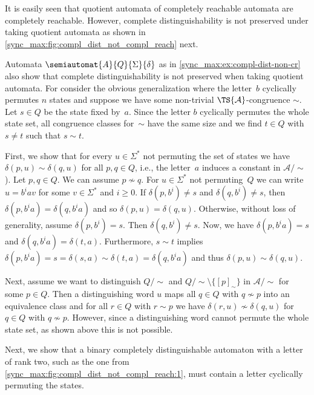 It is easily seen that quotient automata of completely reachable automata
are completely reachable. However, complete distinguishability is not preserved
under taking quotient automata as shown in \cref{sync_max:fig:compl_dist_not_compl_reach} next.

\begin{example} \label{sync_max:fig:compl_dist_not_compl_reach}
	Automata  $\semiautomat{A}{Q}{\Sigma}{\delta}$ as in \cref{sync_max:ex:compl-dist-non-cr}
	also show that complete distinguishability
	is not preserved when taking quotient automata.
	For consider the obvious generalization	where the letter~$b$ cyclically permutes $n$ states
	and suppose we have some non-trivial $\TS{\mathcal A}$-congruence $\sim$.
	Let $s \in Q$ be the state fixed by~$a$.
	Since the letter $b$ cyclically permutes the whole state set,
	all congruence classes for~$\sim$ have the same size
	and we find $t \in Q$ with $s \ne t$
	such that $s \sim t$.
		
	First, we show that for every $u \in \Sigma^*$ not permuting the set of states
	we have $\delta(p, u) \sim \delta(q, u)$
	for all $p,q \in Q$, i.e., the letter~$a$ induces a constant in $\mathcal A / {\sim}$).
	Let $p,q \in Q$. We can assume $p \not\sim q$.
	For $u \in \Sigma^*$ not permuting~$Q$
	we can write $u = b^iav$ for some $v \in \Sigma^*$ and $i \ge 0$.
	If $\delta(p, b^i) \ne s$ 
	and $\delta(q, b^i) \ne s$,
	then $\delta(p, b^ia) = \delta(q, b^ia)$
	and so $\delta(p, u) = \delta(q, u)$.
	Otherwise, without loss of generality, assume $\delta(p, b^i) = s$.
	Then $\delta(q, b^i) \ne s$.
	Now, we have $\delta(p, b^ia) = s$
	and $\delta(q, b^ia) = \delta(t, a)$.
	Furthermore, $s \sim t$
	implies $\delta(p, b^ia) = s = \delta(s, a) \sim \delta(t, a) = \delta(q, b^ia)$
	and thus $\delta(p, u) \sim \delta(q, u)$.
		
	Next, assume we want to distinguish $Q / {\sim}$
	and $Q / {\sim} \setminus \{ [p]_{\sim} \}$
	in $\mathcal A / {\sim}$ for some $p \in Q$.
	Then a distinguishing word $u$
	maps all $q \in Q$ with $q \not\sim p$
	into an equivalence class
	and for all $r \in Q$ with $r \sim p$
	we have $\delta(r, u) \not\sim \delta(q, u)$ for $q \in Q$ with $q \not\sim p$.
	However, since a distinguishing word cannot permute
	the whole state set, as shown above this is not possible.	
\end{example}

Next, we show that a binary completely distinguishable automaton with a letter of rank two, such as the one from \cref{sync_max:fig:compl_dist_not_compl_reach:1}, must contain a letter cyclically permuting the states.

